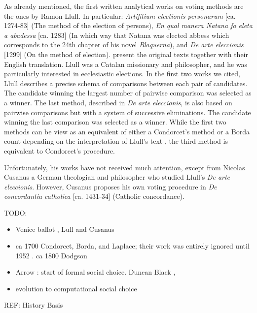 As already mentioned, the first written analytical works on voting methods are the ones by Ramon Llull. In particular: \textit{Artifitium electionis personarum} [ca. 1274-83] (The method of the election of persons), \textit{En qual manera Natana fo eleta a abadessa} [ca. 1283] (In which way that Natana was elected abbess which corresponds to the 24th chapter of his novel \textit{Blaquerna}), and \textit{De arte eleccionis} [1299] (On the method of election). \cite{Hagele2001} present the original texts together with their English translation. Llull was a Catalan missionary and philosopher, and he was particularly interested in ecclesiastic elections. In the first two works we cited, Llull describes a precise schema of comparisons between each pair of candidates. The candidate winning the largest number of pairwise comparison was selected as a winner. The last method, described in \textit{De arte eleccionis}, is also based on pairwise comparisons but with a system of successive eliminations. The candidate winning the last comparison was selected as a winner. While the first two methods can be view as an equivalent of either a Condorcet's method or a Borda count depending on the interpretation of Llull's text \citep{McLean1990}, the third method is equivalent to Condorcet's procedure.

Unfortunately, his works have not received much attention, except from Nicolas Cusanus a German theologian and philosopher who studied Llull's \textit{De arte eleccionis}. However, Cusanus proposes his own voting procedure in \textit{De concordantia catholica} [ca. 1431-34] (Catholic concordance). 









TODO:
\begin{itemize}
	\item Venice ballot \cite{Wolfson1899}, Lull and Cusanus \cite{McLean1990} \citet{Uckelman2010}
	\item ca 1700 Condorcet, Borda, and Laplace; their work was entirely ignored until 1952 . ca 1800 Dodgson
	\item Arrow \cite{Arrow1951}: start of formal social choice. Duncan Black \cite{Black1958}, \citet{Arrow2002,Arrow2011}
	\item evolution to computational social choice \cite{Comsoc2016}
\end{itemize}

REF:
History \citet{McLeanUrken1995,McLean1990,Urken2004} 
Basis \citet{Gaertner2006, Taylor2005, Nitzan2009}







